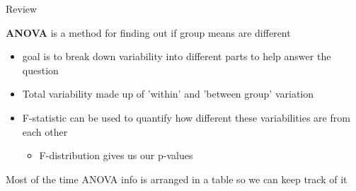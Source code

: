 \documentclass{beamer}
\begin{document}
\begin{frame}{Review}

\textbf{ANOVA} is a method for finding out if group means are different
\begin{itemize}
    \item goal is to break down variability into different parts to help answer the question
\end{itemize} \vspace{6mm}

\begin{itemize}
\item Total variability made up of 'within' and 'between group' variation
\item F-statistic can be used to quantify how different these variabilities are from each other
\begin{itemize}
    \item F-distribution gives us our p-values
\end{itemize}
\end{itemize} \vspace{6mm}

Most of the time ANOVA info is arranged in a table so we can keep track of it
\end{frame}
\end{document}
